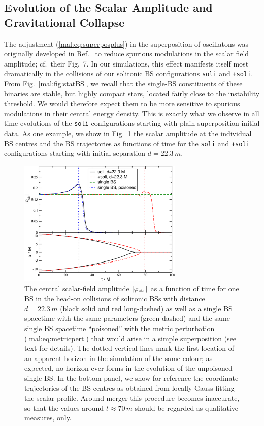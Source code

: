 \subsection{Evolution of the Scalar Amplitude and Gravitational Collapse}
%
The adjustment (\ref{mal:eq:superposplus}) in the superposition of oscillatons
was originally developed in Ref.~\cite{Helfer:2018vtq} to reduce
spurious modulations in the scalar field amplitude; cf.~their
Fig.~7. In our simulations, this effect manifests itself
most dramatically in the collisions of our solitonic BS
configurations {\tt soli} and {\tt +soli}.
From Fig.~\ref{mal:fig:statBS}, we recall that the single-BS constituents
of these binaries are stable, but highly compact stars, located
fairly close to the instability threshold. We would therefore expect
them to be more sensitive to spurious modulations in their central
energy density. This is exactly what we observe in all time evolutions
of the {\tt soli} configurations starting with plain-superposition
initial data. As one example, we show
in Fig.~\ref{mal:fig:soli_ampctr} the scalar amplitude
at the individual BS centres and the BS trajectories
as functions of time for the
{\tt soli} and {\tt +soli} configurations starting with initial
separation $d=22.3\,m$.
%
\begin{figure}
    \centering
    \includegraphics[width=0.7\textwidth]{malaise_source/ampctr_sBS.pdf}
    \caption{The central scalar-field amplitude $|\varphi_{\rm ctr}|$ 
    as a function of time for one BS in the head-on
    collisions of solitonic BSs with distance $d=22.3\,m$
    (black solid and red long-dashed) as well as a single
    BS spacetime with the same parameters (green dashed)
    and the same single BS spacetime ``poisoned'' with
    the metric perturbation (\ref{mal:eq:metricpert}) that would arise in a simple
    superposition (see text for details). The dotted
    vertical lines mark the first location of an
    apparent horizon in the simulation of the same colour;
    as expected, no horizon ever forms in the evolution
    of the unpoisoned single BS.
    In the bottom panel, we show for reference the coordinate
    trajectories of the BS centres as obtained from locally
    Gauss-fitting the scalar profile. Around merger this procedure
    becomes inaccurate, so that the values around $t\approx 70\,m$
    should be regarded as qualitative measures, only.
    }
    \label{mal:fig:soli_ampctr}
\end{figure}
